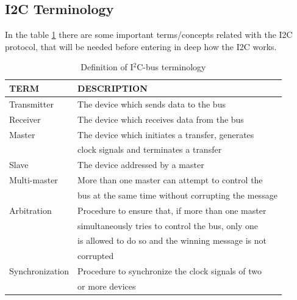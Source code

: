 \subsection{I2C Terminology}
\label{chap:Back_I2C_Terminology}

In the table \ref{tab:i2c_terminology} there are some important terms/concepts related with the 
I2C protocol, that will be needed before entering in deep how the I2C works.

\begin{table}[H]
    \centering
    \begin{tabular}{|l | l|}
        \toprule
        TERM            & DESCRIPTION \\        
        \midrule
        Transmitter     & The device which sends data to the bus \\
        \hline
        Receiver        & The device which receives data from the bus\\
        \hline
        Master          & The device which initiates a transfer, generates\\ 
                        & clock signals and terminates a transfer \\
        \hline
        Slave           & The device addressed by a master \\
        \hline
        Multi-master    & More than one master can attempt to control the \\
                        &  bus at the same time without corrupting the message \\
        \hline
        Arbitration     & Procedure to ensure that, if more than one master \\
                        & simultaneously tries to control the bus, only one \\ 
                        & is allowed to do so and the winning message is not \\
                        & corrupted \\
        \hline
        Synchronization & Procedure to synchronize the clock signals of two \\
                        & or more devices \\
        \bottomrule
    \end{tabular}

    \caption
        {
            Definition of I$^2$C-bus terminology \cite{I2CSpec2000}
        }
    \label{tab:i2c_terminology}
\end{table}